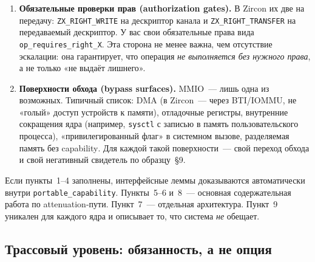 \documentclass[11pt,a4paper]{article}
\begin{document}
\begin{enumerate}[leftmargin=1.4em]
	      Подчеркнём: это не «недосмотр», а структурный выбор класса.
	      Класс \texttt{portable\_capability} описывает операции
	      \emph{ослабления} маски при передаче или копировании: новое
	      право должно быть выводимо из уже имеющегося у источника
	      \emph{в той же транзакции}. \emph{Revoke} меняет права у
	      процесса, который в текущей attenuation-транзакции не
	      участвует, и потому не укладывается в аксиомы
	      \texttt{reduce\_le\_old} и \texttt{close\_infl}~--- не потому,
	      что «даёт эскалацию» (отзыв прав никому не добавляет), а потому,
	      что это другой жизненный цикл capability. В seL4 динамический
	      рекурсивный \texttt{revoke} потребовал отдельной инфраструктуры
	      доказательств именно по этой причине \cite{sel4overview}.
	      Расширение модели до поддержки \texttt{revoke}~---
	      это не «дописать ещё одну лемму», а перейти в другой
	      математический класс. Без этого слоя картина «жизненного
	      цикла права» неполна~--- но неполна она честно, а не по
	      упущению.
	\item \textbf{Обязательные проверки прав (authorization gates).}
	      В Zircon их две на передачу: \texttt{ZX\_RIGHT\_WRITE} на
	      дескриптор канала и \texttt{ZX\_RIGHT\_TRANSFER} на
	      передаваемый дескриптор. У вас свои обязательные права вида
	      \texttt{op\_requires\_right\_X}. Эта сторона не менее важна,
	      чем отсутствие эскалации: она гарантирует, что операция
	      \emph{не выполняется без нужного права}, а не только «не
	      выдаёт лишнего».
	\item \textbf{Поверхности обхода (bypass surfaces).}
	      MMIO~--- лишь одна из возможных. Типичный список: DMA
	      (в Zircon~--- через BTI/IOMMU, не «голый» доступ устройств
	      к памяти), отладочные регистры,
	      внутренние сокращения ядра (например, \texttt{sysctl} с
	      записью в память пользовательского процесса), «привилегированный
	      флаг» в системном вызове, разделяемая память без
	      \textenglish{capability}. Для каждой такой поверхности~--- свой
	      переход обхода и свой негативный свидетель по образцу~§9.
\end{enumerate}

Если пункты~1--4 заполнены, интерфейсные леммы доказываются автоматически
внутри \texttt{portable\_capability}. Пункты~5--6 и~8~--- основная
содержательная работа по attenuation-пути. Пункт~7~--- отдельная
архитектура. Пункт~9 уникален для каждого ядра и описывает то, что
система \emph{не} обещает.

\subsection{Трассовый уровень: обязанность, а не опция}
\label{sec:port-traces}
\end{document}
